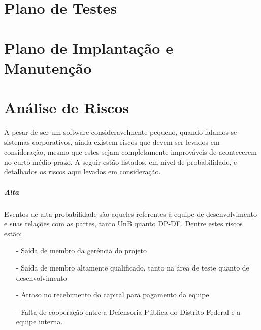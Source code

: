 \documentclass[12pt,a4paper]{report}
\begin{document}

\chapter{Plano de Testes}

\chapter{Plano de Implantação e Manutenção}

\chapter{Análise de Riscos}

A pesar de ser um software consideravelmente pequeno, quando falamos se sistemas corporativos, ainda existem riscos que devem ser levados em consideração, mesmo que estes sejam completamente improváveis de acontecerem no curto-médio prazo. A seguir estão listados, em nível de probabilidade, e detalhados os riscos aqui levados em consideração.

\paragraph{Alta} Eventos de alta probabilidade são aqueles referentes à equipe de desenvolvimento e suas relações com as partes, tanto UnB quanto DP-DF. Dentre estes riscos estão:

\begin{itemize}
\item [-] Saída de membro da gerência do projeto
\item [-] Saída de membro altamente qualificado, tanto na área de teste quanto de desenvolvimento
\item [-] Atraso no recebimento do capital para pagamento da equipe
\item [-] Falta de cooperação entre a Defensoria Pública do Distrito Federal e a equipe interna.
\end{itemize}
\end{document}
